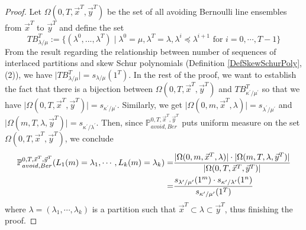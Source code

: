 \begin{proof} Let $\Omega(0,T,\vec{x}^T, \vec{y}^T)$ be the set of all avoiding Bernoulli line ensembles from $\vec{x}^T$ to $\vec{y}^T$ and define the set 
\[TB_{\lambda/\mu}^T:=\{(\lambda^0,...,\lambda^T)\mid \lambda^0=\mu, \lambda^T=\lambda, \lambda^i\preceq\lambda^{i+1}\text{ for }i=0,\cdots,T-1\}\] 
From the result regarding the relationship between number of sequences of interlaced partitions and skew Schur polynomials (Definition \ref{DefSkewSchurPoly}, (2)), we have $\lvert TB_{\lambda/\mu}^T\rvert =s_{\lambda/\mu}(1^T)$. In the rest of the proof, we want to establish the fact that there is a bijection between $\Omega(0,T,\vec{x}^{T},\vec{y}^{T})$ and $TB_{\kappa^{\prime}/\mu^{\prime}}^{T}$ so that we have $\lvert \Omega(0, T, \vec{x}^T, \vec{y}^{T})\rvert=s_{\kappa^{\prime}/\mu^{\prime}}$. Similarly, we get $\lvert \Omega(0, m, \vec{x}^T, \lambda)\rvert=s_{\lambda^{\prime}/\mu^{\prime}}$ and $\lvert \Omega(m, T, \lambda, \vec{y}^{T})\rvert=s_{\kappa^{\prime}/\lambda^{\prime}}$. Then, since $\mathbb{P}_{avoid, Ber}^{0,T,\vec{x}^{T},\vec{y}^{T}}$ puts uniform measure on the set $\Omega(0,T,\vec{x}^{T},\vec{y}^{T})$, we conclude
\begin{align*}
\mathbb{P}_{avoid,Ber}^{0,T,\vec{x}^{T},\vec{y}^{T}}(L_1(m)=\lambda_1,\cdots, L_k(m)=\lambda_k)
=&\frac{\lvert \Omega(0, m, \vec{x}^T, \lambda)\rvert\cdot \lvert \Omega(m, T, \lambda, \vec{y}^T)\rvert}{\lvert \Omega(0, T, \vec{x}^T, \vec{y}^T)\rvert}\\
=&\frac{s_{\lambda^{\prime}/\mu^{\prime}}(1^{m})\cdot s_{\kappa^{\prime}/\lambda^{\prime}}(1^{n})}{s_{\kappa^{\prime}/\mu^{\prime}}(1^T)}
\end{align*} where $\lambda=(\lambda_{1},\cdots,\lambda_{k})$ is a partition such that $\vec{x}^{T}\subset\lambda\subset\vec{y}^{T}$, thus finishing the proof.


\end{proof}
